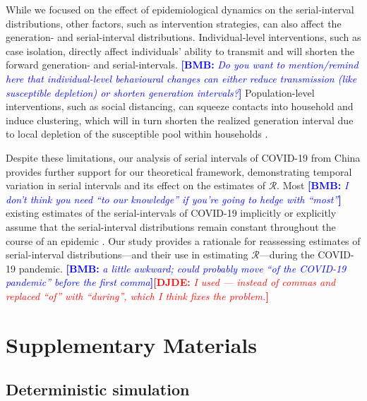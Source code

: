 \documentclass[12pt]{article}
\newcommand{\comment}{\showcomment}
\newcommand{\showcomment}[3]{\textcolor{#1}{\textbf{[#2: }\textsl{#3}\textbf{]}}}
\newcommand{\bmb}[1]{\comment{blue}{BMB}{#1}}
\newcommand{\djde}[1]{\comment{red}{DJDE}{#1}}
\newcommand{\RR}{\ensuremath{{\mathcal R}}\xspace}
\begin{document}
While we focused on the effect of epidemiological dynamics on the serial-interval distributions, other factors, such as intervention strategies, can also affect the generation- and serial-interval distributions.
Individual-level interventions, such as case isolation, directly affect individuals' ability to transmit and will shorten the forward generation- and serial-intervals.
\bmb{Do you want to mention/remind here that individual-level behavioural changes can either reduce transmission (like susceptible depletion) or shorten generation intervals?}
Population-level interventions, such as social distancing, can squeeze contacts into household and induce clustering, which will in turn shorten the realized generation interval due to local depletion of the susceptible pool within households \citep{park2019inferring}.

Despite these limitations, our analysis of serial intervals of COVID-19 from China provides further support for our theoretical framework, demonstrating temporal variation in serial intervals and its effect on the estimates of \RR.
Most \bmb{I don't think you need ``to our knowledge'' if you're going to hedge with ``most''} existing estimates of the serial-intervals of COVID-19 implicitly or explicitly assume that the serial-interval distributions remain constant throughout the course of an epidemic \citep{du2020serial, he2020temporal, nishiura2020serial,tindale2020transmission,zhao2020estimating,zhang2020evolving}.
Our study provides a rationale for reassessing estimates of
serial-interval distributions---and their use in estimating
\RR---during the COVID-19 pandemic. \bmb{a little awkward; could
  probably move ``of the COVID-19 pandemic'' before the first
  comma}\djde{I used --- instead of commas and replaced ``of'' with
  ``during'', which I think fixes the problem.}

\pagebreak

\section{Supplementary Materials}

\subsection{Deterministic simulation}
\end{document}
